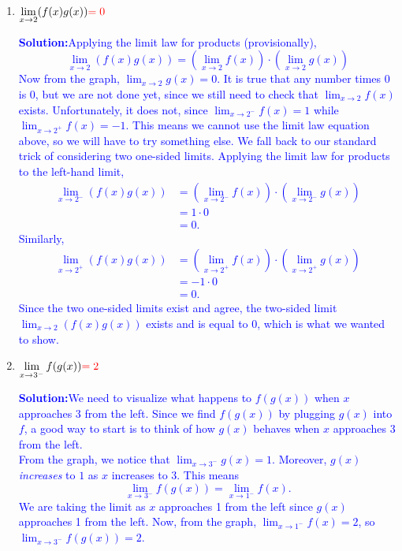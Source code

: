 \documentclass[letterpaper,11pt]{article}
\def\ds{\displaystyle}
\newcommand{\tsol}[1]{\textcolor{red}{#1}}
\newcommand{\sol}[1]{\textcolor{blue}{\textbf{Solution:}}\quad \textcolor{blue}{#1}}
\newcommand{\tsol}[1]{\textcolor{white}{#1}}
\newcommand{\sol}[1]{\vfill}
\begin{document}
\begin{enumerate}
\item $\ds \lim_{x\rightarrow 2} (f(x)g(x))\tsol{=0}$

\sol{Applying the limit law for products (provisionally),
\[
  \lim_{x \to 2} (f(x)g(x)) = \left(\lim_{x \to 2} f(x)\right) \cdot \left(\lim_{x \to 2} g(x) \right)
\]
Now from the graph, $\ds \lim_{x \to 2} g(x) = 0$. It is true that any number times 0 is 0, but we are not
done yet, since we still need to check that $\ds \lim_{x \to 2} f(x)$ exists. Unfortunately, it does not, since
$\ds \lim_{x \to 2^-} f(x) = 1$ while $\ds \lim_{x \to 2^+} f(x) = -1$. This means we cannot use the limit
law equation above, so we will have to try something else.
We fall back to our standard trick of considering two one-sided limits. Applying the limit law for products to the left-hand limit,
\begin{align*}
\lim_{x \to 2^-} (f(x)g(x)) &= \left(\lim_{x \to 2^-} f(x)\right) \cdot \left(\lim_{x \to 2^-} g(x) \right) \\
                                         &= 1 \cdot 0 \\
                                         &= 0.
\end{align*}
Similarly,
\begin{align*}
\lim_{x \to 2^+} (f(x)g(x)) &= \left(\lim_{x \to 2^+} f(x)\right) \cdot \left(\lim_{x \to 2^+} g(x) \right) \\
                                         &= -1 \cdot 0 \\
                                         &= 0.
\end{align*}
Since the two one-sided limits exist and agree, the two-sided limit $\ds \lim_{x \to 2} (f(x)g(x))$ exists and is equal
to 0, which is what we wanted to show.
}

\item $\ds \lim_{x\rightarrow 3^-} f(g(x))\tsol{=2}$

\sol{We need to visualize what happens to $f(g(x))$ when $x$ approaches $3$ from the left. Since we find $f(g(x))$ by plugging $g(x)$ into $f$, a good way to start is to think of how $g(x)$ behaves when $x$
approaches $3$ from the left.\\
From the graph, we notice that $\ds \lim_{x \to 3^-} g(x) = 1$. Moreover, $g(x)$ \emph{increases} to $1$ as $x$ increases to $3$. This means
\[
   \lim_{x \to 3^-} f(g(x)) = \lim_{x \to 1^-} f(x).
\]
We are taking the limit as $x$ approaches 1 from the left since $g(x)$ approaches 1 from the left.
Now, from the graph, $\ds \lim_{x \to 1^-} f(x) = 2$, so $\ds \lim_{x \to 3^-} f(g(x)) = 2$.
}


\end{enumerate}
\end{document}
